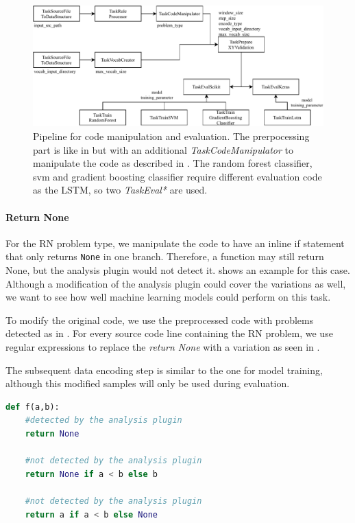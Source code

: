 \begin{figure}
    \includegraphics[width=1\textwidth]{img/ML/Pipeline_RQ3.pdf}
    \caption[Pipeline for code manipulation and evaluation.]{Pipeline for code manipulation and evaluation. The prerpocessing part is like in  but with an additional \textit{TaskCodeManipulator} to manipulate the code as described in . The random forest classifier, svm and gradient boosting classifier require different evaluation code as the LSTM, so two \textit{TaskEval*} are used. }
    \label{fig:pipeline_RQ3}
\end{figure}


\paragraph{Return None}\label{par:manipulation_return_none}
For the RN problem type, we manipulate the code to have an inline if statement that only returns \texttt{None} in one branch. Therefore, a function may still return None, but the analysis plugin would not detect it.  shows an example for this case. Although a modification of the analysis plugin could cover the variations as well, we want to see how well machine learning models could perform on this task.

To modify the original code, we use the preprocessed code with problems detected as in . For every source code line containing the RN problem, we use regular expressions to replace the \textit{return None} with a variation as seen in . 

The subsequent data encoding step is similar to the one for model training, although this modified samples will only be used during evaluation.

\begin{minipage}[c]{\linewidth}
\begin{lstlisting}[language=Python, label=lst:return_none_modified, caption={Samples for returning None. The analysis plugin would flag the first return; the second and third return are modified variations that would be ignored by the analysis plugin. The performance of the machine learning models on detecting the latter will be evaluated.}]
def f(a,b):
    #detected by the analysis plugin
    return None 

    #not detected by the analysis plugin
    return None if a < b else b 

    #not detected by the analysis plugin
    return a if a < b else None \end{lstlisting}
\end{minipage}

